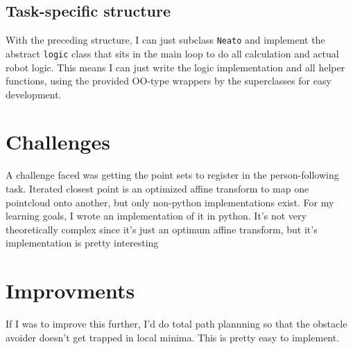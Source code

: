 \documentclass[]{article}
\begin{document}
\subsection{Task-specific structure}
With the preceding structure, I can just subclass \verb|Neato| and implement the abstract \verb|logic| class that sits in the main loop to do all calculation and actual robot  logic. This means I can just write the logic implementation and all helper functions, using the provided OO-type wrappers by the superclasses for easy development.
\section{Challenges}
A challenge faced was getting the point sets to register in the person-following task. Iterated closest point is an optimized affine transform to map one pointcloud onto another, but only non-python implementations exist. For my learning goals, I wrote an implementation of it in python. It's not very theoretically complex since it's just an optimum affine transform, but it's implementation is pretty interesting
\section{Improvments}
If I was to improve this further, I'd do total path plannning so that the obstacle avoider doesn't get trapped in local minima. This is pretty easy to implement.
\end{document}
